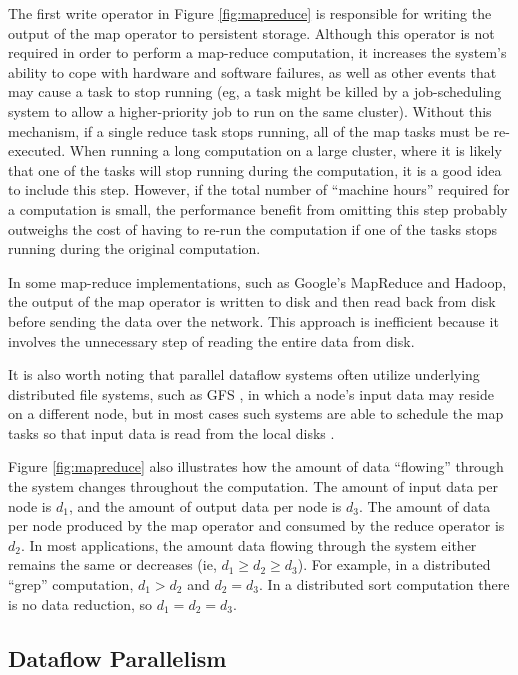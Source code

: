 \documentclass{acm_proc_article-sp}
\begin{document}
The first write operator in Figure \ref{fig:mapreduce} is responsible for writing
the output of the map operator to persistent storage. Although this operator is not
required in order to perform a map-reduce computation, it increases the
system's ability to cope with hardware and software failures, as well as other
events that may cause a task to stop running (eg, a task might be killed by a
job-scheduling system to allow a higher-priority job to run on the same
cluster). Without this mechanism, if a single reduce task stops running, all of the map tasks must be re-executed. When running a long computation on a large cluster, where it is
likely that one of the tasks will stop running during the computation, it is a
good idea to include this step. However, if the total number of ``machine
hours'' required for a computation is small, the performance benefit from
omitting this step probably outweighs the cost of having to re-run the
computation if one of the tasks stops running during the original
computation.

In some map-reduce implementations, such as Google's MapReduce and Hadoop, the
output of the map operator is written to disk and then read back from disk
before sending the data over the network. This approach is inefficient because
it involves the unnecessary step of reading the entire data from disk.

It is also worth noting that parallel dataflow systems often utilize underlying
distributed file systems, such as GFS \cite{gfs}, in which a node's input data
may reside on a different node, but in most cases such systems are able to
schedule the map tasks so that input data is read from the local disks
\cite{mapreduce}.

Figure \ref{fig:mapreduce} also illustrates how the amount of data ``flowing'' through the system changes throughout the computation. The amount of input data per node is $d_1$, and the amount of output data per node is $d_3$. The amount of data per node produced by the map operator and consumed by the reduce operator is $d_2$. In most applications, the amount data flowing through the system either remains the same or decreases (ie, $d_1 \ge d_2 \ge d_3$). For example, in a distributed ``grep'' computation, $d_1 > d_2$ and $d_2 = d_3$. In a distributed sort computation there is no data reduction, so $d_1 = d_2 = d_3$.

\subsection{Dataflow Parallelism}
\end{document}
